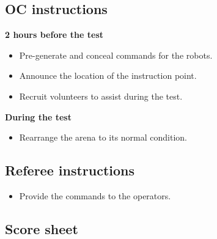 \subsection*{OC instructions}
\textbf{2 hours before the test}
\begin{itemize}[nosep]
	\item Pre-generate and conceal commands for the robots.
	\item Announce the location of the instruction point.
	\item Recruit volunteers to assist during the test.
\end{itemize}
\textbf{During the test}
\begin{itemize}[nosep]
	\item Rearrange the arena to its normal condition.
\end{itemize}

\subsection*{Referee instructions}
\begin{itemize}[nosep]
	\item Provide the commands to the operators.
\end{itemize}


\subsection*{Score sheet}


